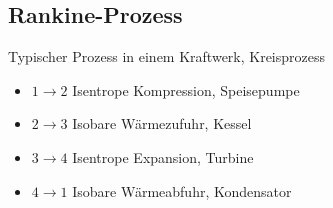 \documentclass[12pt]{article}
\begin{document}
\subsection{Rankine-Prozess}
Typischer Prozess in einem Kraftwerk, Kreisprozess
\begin{itemize}
\item $1 \rightarrow 2$ Isentrope Kompression, Speisepumpe
\item $2 \rightarrow 3$ Isobare Wärmezufuhr, Kessel
\item $3 \rightarrow 4$ Isentrope Expansion, Turbine
\item $4 \rightarrow 1$ Isobare Wärmeabfuhr, Kondensator
\end{itemize}
\end{document}
